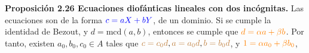 \documentclass[a4paper, 11pt]{extarticle}
\newcommand{\propo}[1]{\textcolor{rojo}{\textbf{Proposición #1}}}
\begin{document}
\vspace{-1em}
\begin{center}
\end{center}
\vspace{-1em}
\vspace{-2em}
\propo{2.26 Ecuaciones diofánticas lineales con dos incógnitas.} Las ecuaciones 
son de la forma \(\textcolor{blue}{c = aX + bY}\), de un dominio. Si se cumple la identidad de 
Bezout, y \(d = \text{mcd}(a, b)\), entonces se cumple que \(\textcolor{orange}{ d = \alpha a +
\beta b }\). Por tanto, existen \(a_0, b_0, c_0 \in A\) tales que \(\textcolor{brown}{c = c_0d},
\textcolor{brown}{a = a_0d},\textcolor{brown}{ b = b_0d}\), y \(\textcolor{orange}{ 1 = \alpha a_0 + \beta b_0 }\),
\end{document}
